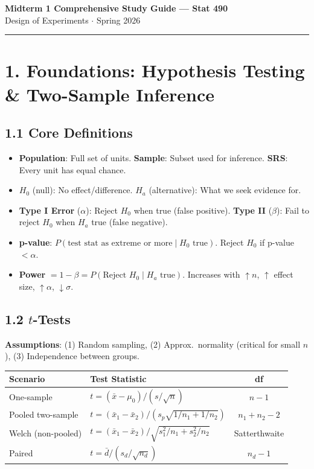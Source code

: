\documentclass[9pt,letterpaper]{article}
\begin{document}
\begin{center}
{\Large \textbf{Midterm 1 Comprehensive Study Guide --- Stat 490}}\\[2pt]
{\small Design of Experiments $\cdot$ Spring 2026}
\end{center}
\vspace{-4pt}\hrule\vspace{4pt}

\section{1. Foundations: Hypothesis Testing \& Two-Sample Inference}

\subsection{1.1 Core Definitions}
\begin{itemize}
    \item \textbf{Population}: Full set of units. \textbf{Sample}: Subset used for inference. \textbf{SRS}: Every unit has equal chance.
    \item \textbf{$H_0$} (null): No effect/difference. \textbf{$H_a$} (alternative): What we seek evidence for.
    \item \textbf{Type I Error} ($\alpha$): Reject $H_0$ when true (false positive). \textbf{Type II} ($\beta$): Fail to reject $H_0$ when $H_a$ true (false negative).
    \item \textbf{p-value}: $P(\text{test stat as extreme or more} \mid H_0 \text{ true})$. Reject $H_0$ if p-value $< \alpha$.
    \item \textbf{Power} $= 1 - \beta = P(\text{Reject } H_0 \mid H_a \text{ true})$. Increases with $\uparrow n$, $\uparrow$ effect size, $\uparrow \alpha$, $\downarrow \sigma$.
\end{itemize}

\subsection{1.2 $t$-Tests}
\textbf{Assumptions}: (1) Random sampling, (2) Approx.\ normality (critical for small $n$), (3) Independence between groups.

\begin{center}\small
\begin{tabular}{@{}llc@{}}
\toprule
\textbf{Scenario} & \textbf{Test Statistic} & \textbf{df} \\
\midrule
One-sample & $t = (\bar{x} - \mu_0)/(s/\sqrt{n})$ & $n-1$ \\
Pooled two-sample & $t = (\bar{x}_1 - \bar{x}_2)/(s_p\sqrt{1/n_1 + 1/n_2})$ & $n_1+n_2-2$ \\
Welch (non-pooled) & $t = (\bar{x}_1 - \bar{x}_2)/\sqrt{s_1^2/n_1 + s_2^2/n_2}$ & Satterthwaite \\
Paired & $t = \bar{d}/(s_d/\sqrt{n_d})$ & $n_d - 1$ \\
\bottomrule
\end{tabular}
\end{center}
\end{document}
